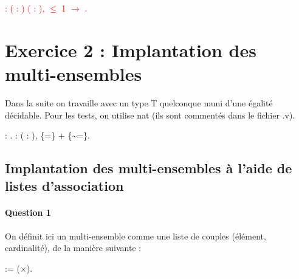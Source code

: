 \documentclass{report}
\begin{document}
\begin{coqdoccode}

\coqdocnoindent
\textcolor{red}{
  : \coqdockw{\ensuremath{\forall}} ( :  ) ( : ),    \ensuremath{\le} 1 \ensuremath{\rightarrow}  .\coqdoceol
\coqdocemptyline
\coqdocemptyline}
\end{coqdoccode}

\section{Exercice 2 : Implantation des multi-ensembles}

Dans la suite on travaille avec un type T quelconque muni d’une égalité décidable. Pour les tests, on utilise nat (ils sont commentés dans le fichier .v).

\begin{coqdoccode}
\coqdocemptyline
\coqdocnoindent
{}  : .\coqdoceol
\coqdocemptyline
\coqdocnoindent
{}  : \coqdockw{\ensuremath{\forall}} (  : ), \{=\} + \{\~{}=\}.\coqdoceol
\coqdocemptyline

\end{coqdoccode}

\subsection{Implantation des multi-ensembles à l’aide de listes d’association\\}

\paragraph{Question 1}

On définit ici un multi-ensemble comme une liste de couples (élément, cardinalité), de la manière suivante :

\begin{coqdoccode}
\coqdocemptyline
\coqdocnoindent
{}  :=  (\ensuremath{\times}).\coqdoceol
\coqdocemptyline
\coqdocemptyline
\end{coqdoccode}
\end{document}
